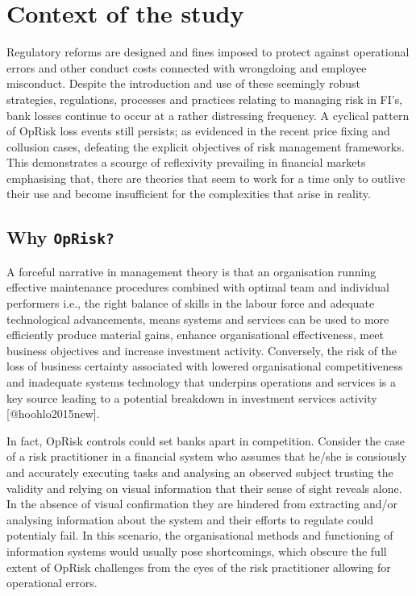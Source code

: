 \documentclass[
]{article}
\begin{document}
\section{Context of the study}
\label{sec:Context of the study}

Regulatory reforms are designed and fines imposed to protect against
operational errors and other conduct costs connected with wrongdoing and
employee misconduct. Despite the introduction and use of these seemingly
robust strategies, regulations, processes and practices relating to
managing risk in FI's, bank losses continue to occur at a rather
distressing frequency. A cyclical pattern of OpRisk loss events still
persists; as evidenced in the recent price fixing and collusion cases,
defeating the explicit objectives of risk management frameworks. This
demonstrates a scourge of reflexivity prevailing in financial markets
emphasising that, there are theories that seem to work for a time only
to outlive their use and become insufficient for the complexities that
arise in reality.

\subsection{Why \texttt{OpRisk?}}

A forceful narrative in management theory is that an organisation
running effective maintenance procedures combined with optimal team and
individual performers i.e., the right balance of skills in the labour
force and adequate technological advancements, means systems and
services can be used to more efficiently produce material gains, enhance
organisational effectiveness, meet business objectives and increase
investment activity. Conversely, the risk of the loss of business
certainty associated with lowered organisational competitiveness and
inadequate systems technology that underpins operations and services is
a key source leading to a potential breakdown in investment services
activity {[}@hoohlo2015new{]}.\medskip

In fact, OpRisk controls could set banks apart in competition. Consider
the case of a risk practitioner in a financial system who assumes that
he/she is consiously and accurately executing tasks and analysing an
observed subject trusting the validity and relying on visual information
that their sense of sight reveals alone. In the absence of visual
confirmation they are hindered from extracting and/or analysing
information about the system and their efforts to regulate could
potentialy fail. In this scenario, the organisational methods and
functioning of information systems would usually pose shortcomings,
which obscure the full extent of OpRisk challenges from the eyes of the
risk practitioner allowing for operational errors. \medskip
\end{document}
